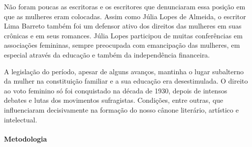 \documentclass[12pt]{extarticle}
\begin{document}



Não foram poucas as escritoras e os escritores que denunciaram essa
posição em que as mulheres eram colocadas. Assim como Júlia Lopes de
Almeida, o escritor Lima Barreto também foi um defensor ativo dos
direitos das mulheres em suas crônicas e em seus romances. Júlia Lopes
participou de muitas conferências em associações femininas, sempre
preocupada com emancipação das mulheres, em especial através da educação
e também da independência financeira.


A legislação do período, apesar de
alguns avanços, mantinha o lugar subalterno da mulher na constituição
familiar e a sua educação era desestimulada. O direito ao voto feminino
só foi conquistado na década de 1930, depois de intensos debates e lutas
dos movimentos sufragistas. Condições, entre outras, que influenciaram
decisivamente na formação do nosso cânone literário, artístico e
intelectual.




\paragraph{Metodologia}
\end{document}
